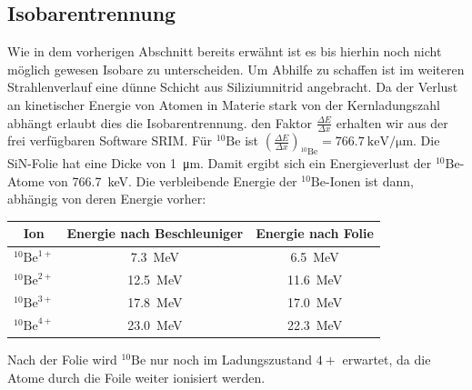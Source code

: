 \clearpage

\subsection{Isobarentrennung}
Wie in dem vorherigen Abschnitt bereits erwähnt ist es bis hierhin noch nicht möglich gewesen Isobare zu unterscheiden.
Um Abhilfe zu schaffen ist im weiteren Strahlenverlauf eine dünne Schicht aus Siliziumnitrid angebracht.
Da der Verlust an kinetischer Energie von Atomen in Materie stark von der Kernladungszahl abhängt erlaubt dies die Isobarentrennung.
den Faktor $\frac{\Delta E}{\Delta x}$ erhalten wir aus der frei verfügbaren Software SRIM.
Für $^{10}\text{Be}$ ist $\left (\frac{\Delta E}{\Delta x}\right )_{^{10}\text{Be}} = \SI{766.7}{\kilo\electronvolt\per\micro\metre}$.
Die SiN-Folie hat eine Dicke von \SI{1}{\micro\metre}.
Damit ergibt sich ein Energieverlust der $^{10}\text{Be}$-Atome von \SI{766.7}{\kilo\electronvolt}.
Die verbleibende Energie der $^{10}\text{Be}$-Ionen ist dann, abhängig von deren Energie vorher:
\begin{center}
  \begin{tabular}{|c|c|c|}
    \hline
    Ion & Energie nach Beschleuniger & Energie nach Folie \\
    \hline
    $^{10}\text{Be}^{1+}$ & \SI{7.3}{\mega\electronvolt}  & \SI{6.5}{\mega\electronvolt}  \\
    $^{10}\text{Be}^{2+}$ & \SI{12.5}{\mega\electronvolt} & \SI{11.6}{\mega\electronvolt} \\
    $^{10}\text{Be}^{3+}$ & \SI{17.8}{\mega\electronvolt} & \SI{17.0}{\mega\electronvolt} \\
    $^{10}\text{Be}^{4+}$ & \SI{23.0}{\mega\electronvolt} & \SI{22.3}{\mega\electronvolt} \\
    \hline
  \end{tabular}
  \label{Auswertung_tab_Ionenenergien_nach_Folie}
\end{center}
Nach der Folie wird $^{10}\text{Be}$ nur noch im Ladungszustand $4+$ erwartet, da die Atome durch die Foile weiter ionisiert werden.

